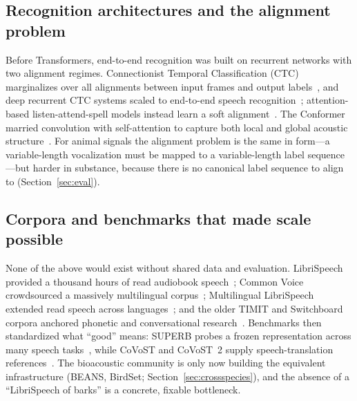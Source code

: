 \subsection{Recognition architectures and the alignment problem}
Before Transformers, end-to-end recognition was built on recurrent networks
with two alignment regimes. Connectionist Temporal Classification (CTC)
marginalizes over all alignments between input frames and output
labels~\cite{graves2006ctc}, and deep recurrent CTC systems scaled to
end-to-end speech recognition~\cite{graves2013speech,amodei2016deepspeech2};
attention-based listen-attend-spell models instead learn a soft
alignment~\cite{chan2016las}. The Conformer married convolution with
self-attention to capture both local and global acoustic
structure~\cite{gulati2020conformer}. For animal signals the alignment
problem is the same in form---a variable-length vocalization must be mapped
to a variable-length label sequence---but harder in substance, because there
is no canonical label sequence to align to (Section~\ref{sec:eval}).

\subsection{Corpora and benchmarks that made scale possible}
None of the above would exist without shared data and evaluation. LibriSpeech
provided a thousand hours of read audiobook
speech~\cite{panayotov2015librispeech}; Common Voice crowdsourced a massively
multilingual corpus~\cite{ardila2020commonvoice}; Multilingual LibriSpeech
extended read speech across languages~\cite{pratap2020mls}; and the older
TIMIT and Switchboard corpora anchored phonetic and conversational
research~\cite{garofolo1993timit,godfrey1992switchboard}. Benchmarks then
standardized what ``good'' means: SUPERB probes a frozen representation across
many speech tasks~\cite{yang2021superb}, while CoVoST and CoVoST~2 supply
speech-translation references~\cite{wang2020covost,wang2021covost2}. The
bioacoustic community is only now building the equivalent infrastructure
(BEANS, BirdSet; Section~\ref{sec:crossspecies}), and the absence of a
``LibriSpeech of barks'' is a concrete, fixable bottleneck.

